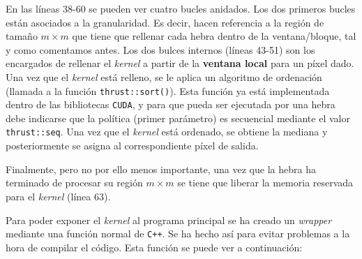 \documentclass[11pt,a4paper]{article}
\begin{document}
En las líneas 38-60 se pueden ver cuatro bucles anidados. Los dos primeros bucles están
asociados a la granularidad. Es decir, hacen referencia a la región de tamaño $m \times m$ que
tiene que rellenar cada hebra dentro de la ventana/bloque, tal y como comentamos antes.
Los dos bulces internos (líneas 43-51) son los encargados de rellenar el \textit{kernel}
a partir de la \textbf{ventana local} para un píxel dado. Una vez que el \textit{kernel} está
relleno, se le aplica un algoritmo de ordenación (llamada a la función \texttt{thrust::sort()}).
Esta función ya está implementada dentro de las bibliotecas \texttt{CUDA}, y para que
pueda ser ejecutada por una hebra debe indicarse que la política (primer parámetro)
es secuencial mediante el valor \texttt{thrust::seq}. Una vez que el \textit{kernel} está
ordenado, se obtiene la mediana y posteriormente se asigna al correspondiente píxel de salida.

Finalmente, pero no por ello menos importante, una vez que la hebra ha terminado de procesar
su región $m \times m$ se tiene que liberar la memoria reservada para el \textit{kernel}
(línea 63).

Para poder exponer el \textit{kernel} al programa principal se ha creado un \textit{wrapper}
mediante una función normal de \texttt{C++}. Se ha hecho así para evitar problemas a la hora
de compilar el código. Esta función se puede ver a continuación:
\end{document}
